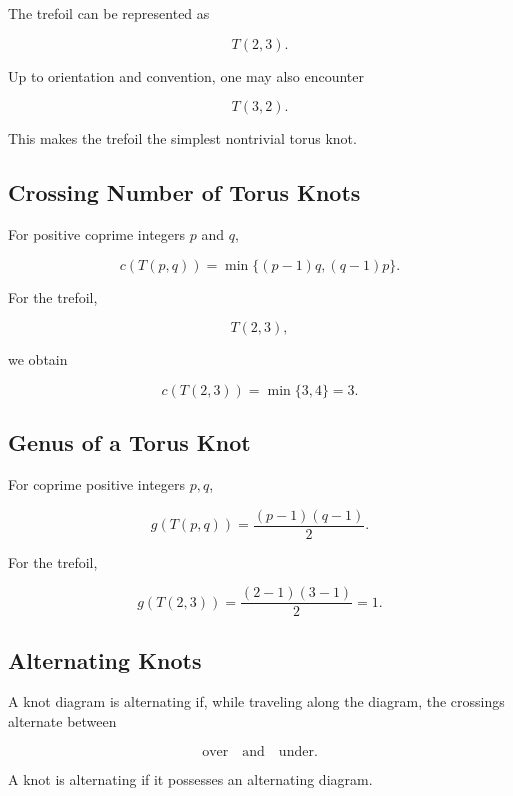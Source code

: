The trefoil can be represented as

\[
\boxed{
T(2,3).
}
\]

Up to orientation and convention, one may also encounter

\[
T(3,2).
\]

This makes the trefoil the simplest nontrivial torus knot.

\subsection{Crossing Number of Torus Knots}
\label{subsec:crossing-number-torus-knots}

For positive coprime integers \(p\) and \(q\),

\[
\boxed{
c(T(p,q))
=
\min\{(p-1)q,(q-1)p\}.
}
\]

For the trefoil,

\[
T(2,3),
\]

we obtain

\[
c(T(2,3))
=
\min\{3,4\}
=
3.
\]

\subsection{Genus of a Torus Knot}
\label{subsec:genus-torus-knot}

For coprime positive integers \(p,q\),

\[
\boxed{
g(T(p,q))
=
\frac{(p-1)(q-1)}{2}.
}
\]

For the trefoil,

\[
g(T(2,3))
=
\frac{(2-1)(3-1)}{2}
=
1.
\]

\subsection{Alternating Knots}
\label{subsec:alternating-knots}

A knot diagram is alternating if, while traveling along the diagram, the
crossings alternate between

\[
\boxed{
\text{over}
\quad\text{and}\quad
\text{under}.
}
\]

A knot is alternating if it possesses an alternating diagram.

